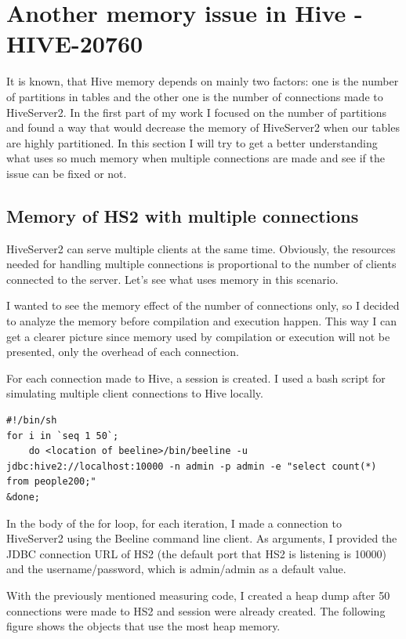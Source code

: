 \chapter{Another memory issue in Hive - HIVE-20760}
It is known, that Hive memory depends on mainly two factors: one is the number of partitions in tables and the other one is the number of connections made to HiveServer2. In the first part of my work I focused on the number of partitions and found a way that would decrease the memory of HiveServer2 when our tables are highly partitioned. In this section I will try to get a better understanding what uses so much memory when multiple connections are made and see if the issue can be fixed or not. 

\section{Memory of HS2 with multiple connections}
HiveServer2 can serve multiple clients at the same time. Obviously, the resources needed for handling multiple connections is proportional to the number of clients connected to the server. Let's see what uses memory in this scenario.

I wanted to see the memory effect of the number of connections only, so I decided to analyze the memory before compilation and execution happen. This way I can get a clearer picture since memory used by compilation or execution will not be presented, only the overhead of each connection. 

For each connection made to Hive, a session is created. I used a bash script for simulating multiple client connections to Hive locally. 

\begin{lstlisting}
#!/bin/sh
for i in `seq 1 50`; 
	do <location of beeline>/bin/beeline -u jdbc:hive2://localhost:10000 -n admin -p admin -e "select count(*) from people200;" 
&done;	
\end{lstlisting}

In the body of the for loop, for each iteration, I made a connection to HiveServer2 using the Beeline command line client. As arguments, I provided the JDBC connection URL of HS2 (the default port that HS2 is listening is 10000) and the username/password, which is admin/admin as a default value.

With the previously mentioned measuring code, I created a heap dump after 50 connections were made to HS2 and session were already created. The following figure shows the objects that use the most heap memory.

